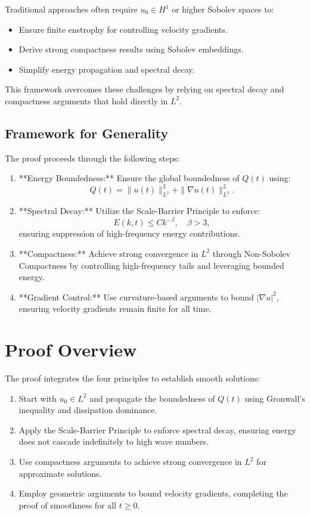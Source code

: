 Traditional approaches often require $u_0 \in H^1$ or higher Sobolev spaces to:
\begin{itemize}
    \item Ensure finite enstrophy for controlling velocity gradients.
    \item Derive strong compactness results using Sobolev embeddings.
    \item Simplify energy propagation and spectral decay.
\end{itemize}
This framework overcomes these challenges by relying on spectral decay and compactness arguments that hold directly in $L^2$.

\subsection{Framework for Generality}

The proof proceeds through the following steps:
\begin{enumerate}
    \item **Energy Boundedness:** Ensure the global boundedness of $Q(t)$ using:
    \begin{equation}
    Q(t) = \|u(t)\|_{L^2}^2 + \|\nabla u(t)\|_{L^2}^2.
    \end{equation}
    \item **Spectral Decay:** Utilize the Scale-Barrier Principle to enforce:
    \begin{equation}
    E(k, t) \leq C k^{-\beta}, \quad \beta > 3,
    \end{equation}
    ensuring suppression of high-frequency energy contributions.
    \item **Compactness:** Achieve strong convergence in $L^2$ through Non-Sobolev Compactness by controlling high-frequency tails and leveraging bounded energy.
    \item **Gradient Control:** Use curvature-based arguments to bound $|\nabla u|^2$, ensuring velocity gradients remain finite for all time.
\end{enumerate}

\section{Proof Overview}
The proof integrates the four principles to establish smooth solutions:
\begin{enumerate}
    \item Start with $u_0 \in L^2$ and propagate the boundedness of $Q(t)$ using Gronwall’s inequality and dissipation dominance.
    \item Apply the Scale-Barrier Principle to enforce spectral decay, ensuring energy does not cascade indefinitely to high wave numbers.
    \item Use compactness arguments to achieve strong convergence in $L^2$ for approximate solutions.
    \item Employ geometric arguments to bound velocity gradients, completing the proof of smoothness for all $t \geq 0$.
\end{enumerate}

